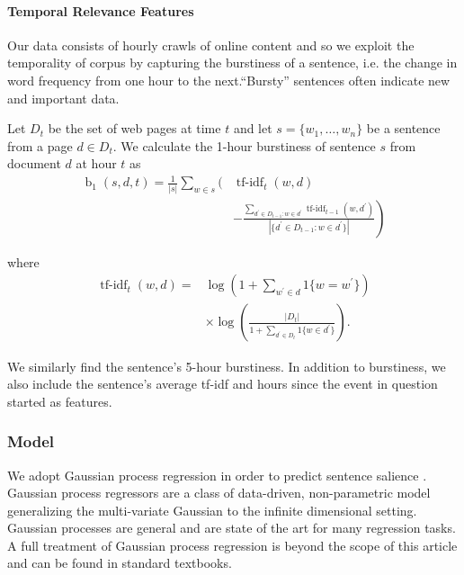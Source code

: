 \paragraph{Temporal Relevance Features}

Our data consists of hourly crawls of online content and so we exploit the temporality of corpus by capturing the burstiness of a sentence, i.e.  the change in word frequency from one hour to the next.``Bursty'' sentences often indicate new and important data. 

Let $D_t$ be the set of web pages at time $t$ and let $s = \{w_1,\ldots,w_n\}$ be a sentence from a page $d \in D_t$.  We calculate the 1-hour burstiness of sentence $s$ from document $d$ at hour $t$  as 
\begin{align*}
\operatorname{b}_1(s,d,t) = \frac{1}{|s|} \sum_{w \in s} \Bigg( &
\operatorname{tf-idf}_t(w,d)  \\ & \left. - \frac{\sum_{d^\prime \in D_{t-1}:
w \in d^\prime } \operatorname{tf-idf}_{t-1}(w,d^\prime)}{|\{d^\prime \in
D_{t-1}: w \in d^\prime\}|} \right) \end{align*}

where \begin{align*} \operatorname{tf-idf}_t(w,d) =&
\log\left(1+\sum_{w^\prime \in d}1\{w=w^\prime\}  \right)\\ & \times
\log\left(\frac{|D_t|}{1 + \sum_{d^\prime \in D_t}1\{w \in d^\prime\}}\right).
\end{align*}


We similarly find the sentence's 5-hour burstiness.  In addition to burstiness, we also include the sentence's average tf-idf and hours since the event in question started as features.

\subsubsection{Model}
We adopt Gaussian process regression in order to predict sentence salience
\cite{rasmussen:gaussian-process-book}.  Gaussian process regressors are a
class of data-driven, non-parametric model generalizing the multi-variate
Gaussian to the infinite dimensional setting.  Gaussian processes are general
and are state of the art for many regression tasks.  A full treatment of
Gaussian process regression is beyond the scope of this article and can be
found in standard textbooks.


